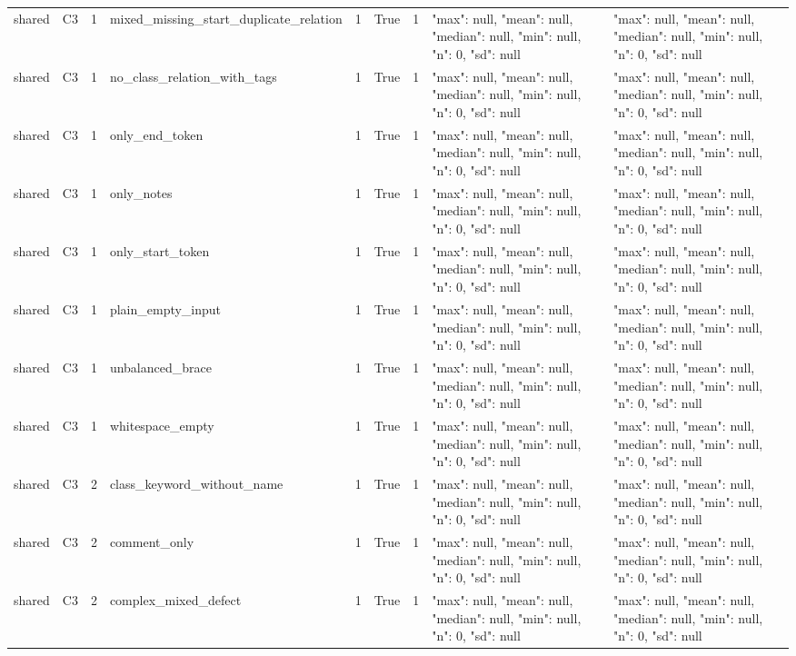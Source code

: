 \begin{tabular}{lllllllll}
shared & C3 & 1 & mixed\_missing\_start\_duplicate\_relation & 1 & True & 1 & {"max": null, "mean": null, "median": null, "min": null, "n": 0, "sd": null} & {"max": null, "mean": null, "median": null, "min": null, "n": 0, "sd": null} \\
shared & C3 & 1 & no\_class\_relation\_with\_tags & 1 & True & 1 & {"max": null, "mean": null, "median": null, "min": null, "n": 0, "sd": null} & {"max": null, "mean": null, "median": null, "min": null, "n": 0, "sd": null} \\
shared & C3 & 1 & only\_end\_token & 1 & True & 1 & {"max": null, "mean": null, "median": null, "min": null, "n": 0, "sd": null} & {"max": null, "mean": null, "median": null, "min": null, "n": 0, "sd": null} \\
shared & C3 & 1 & only\_notes & 1 & True & 1 & {"max": null, "mean": null, "median": null, "min": null, "n": 0, "sd": null} & {"max": null, "mean": null, "median": null, "min": null, "n": 0, "sd": null} \\
shared & C3 & 1 & only\_start\_token & 1 & True & 1 & {"max": null, "mean": null, "median": null, "min": null, "n": 0, "sd": null} & {"max": null, "mean": null, "median": null, "min": null, "n": 0, "sd": null} \\
shared & C3 & 1 & plain\_empty\_input & 1 & True & 1 & {"max": null, "mean": null, "median": null, "min": null, "n": 0, "sd": null} & {"max": null, "mean": null, "median": null, "min": null, "n": 0, "sd": null} \\
shared & C3 & 1 & unbalanced\_brace & 1 & True & 1 & {"max": null, "mean": null, "median": null, "min": null, "n": 0, "sd": null} & {"max": null, "mean": null, "median": null, "min": null, "n": 0, "sd": null} \\
shared & C3 & 1 & whitespace\_empty & 1 & True & 1 & {"max": null, "mean": null, "median": null, "min": null, "n": 0, "sd": null} & {"max": null, "mean": null, "median": null, "min": null, "n": 0, "sd": null} \\
shared & C3 & 2 & class\_keyword\_without\_name & 1 & True & 1 & {"max": null, "mean": null, "median": null, "min": null, "n": 0, "sd": null} & {"max": null, "mean": null, "median": null, "min": null, "n": 0, "sd": null} \\
shared & C3 & 2 & comment\_only & 1 & True & 1 & {"max": null, "mean": null, "median": null, "min": null, "n": 0, "sd": null} & {"max": null, "mean": null, "median": null, "min": null, "n": 0, "sd": null} \\
shared & C3 & 2 & complex\_mixed\_defect & 1 & True & 1 & {"max": null, "mean": null, "median": null, "min": null, "n": 0, "sd": null} & {"max": null, "mean": null, "median": null, "min": null, "n": 0, "sd": null} \\

\end{tabular}
